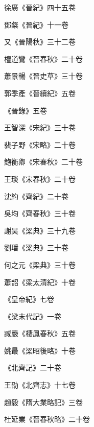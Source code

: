 \begin{pinyinscope}
 徐廣《晉紀》四十五卷



 鄧粲《晉紀》十一卷



 又《晉陽秋》三十二卷



 檀道鸞《晉春秋》二十卷



 蕭景暢《晉史草》三十卷



 郭季產《晉續紀》五卷



 《晉錄》五卷



 王智深《宋紀》三十卷



 裴子野《宋略》二十卷



 鮑衡卿《宋春秋》二十卷



 王琰《宋春秋》二十卷



 沈約《齊紀》二十卷



 吳均《齊春秋》三十卷



 謝昊《梁典》三十九卷



 劉璠《梁典》三十卷



 何之元《梁典》三十卷



 蕭韶《梁太清紀》十卷



 《皇帝紀》七卷



 《梁末代記》一卷



 臧嚴《棲鳳春秋》五卷



 姚最《梁昭後略》十卷



 《北齊記》二十卷



 王劭《北齊志》十七卷



 趙毅《隋大業略記》三卷



 杜延業《晉春秋略》二十卷




\end{pinyinscope}
